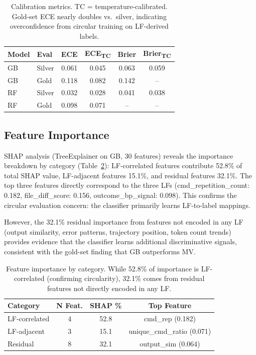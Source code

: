 \documentclass[11pt,a4paper]{article}
\begin{document}
\begin{table}[t]
\centering
\small
\begin{tabular}{llcccc}
\toprule
\textbf{Model} & \textbf{Eval} & \textbf{ECE} & \textbf{ECE\textsubscript{TC}} & \textbf{Brier} & \textbf{Brier\textsubscript{TC}} \\
\midrule
GB & Silver & 0.061 & 0.045 & 0.063 & 0.059 \\
GB & Gold & 0.118 & 0.082 & 0.142 & -- \\
RF & Silver & 0.032 & 0.028 & 0.041 & 0.038 \\
RF & Gold & 0.098 & 0.071 & -- & -- \\
\bottomrule
\end{tabular}
\caption{Calibration metrics. TC = temperature-calibrated. Gold-set ECE nearly doubles vs.\ silver, indicating overconfidence from circular training on LF-derived labels.}
\label{tab:calibration}
\end{table}

\subsection{Feature Importance}

SHAP analysis (TreeExplainer on GB, 30 features) reveals the importance breakdown by category (Table~\ref{tab:importance}):
LF-correlated features contribute 52.8\% of total SHAP value, LF-adjacent features 15.1\%, and residual features 32.1\%.
The top three features directly correspond to the three LFs (cmd\_repetition\_count: 0.182, file\_diff\_score: 0.156, outcome\_bp\_signal: 0.098).
This confirms the circular evaluation concern: the classifier primarily learns LF-to-label mappings.

However, the 32.1\% residual importance from features not encoded in any LF (output similarity, error patterns, trajectory position, token count trends) provides evidence that the classifier learns additional discriminative signals, consistent with the gold-set finding that GB outperforms MV.

\begin{table}[t]
\centering
\small
\begin{tabular}{lccc}
\toprule
\textbf{Category} & \textbf{N Feat.} & \textbf{SHAP \%} & \textbf{Top Feature} \\
\midrule
LF-correlated & 4 & 52.8 & cmd\_rep (0.182) \\
LF-adjacent & 3 & 15.1 & unique\_cmd\_ratio (0.071) \\
Residual & 8 & 32.1 & output\_sim (0.064) \\
\bottomrule
\end{tabular}
\caption{Feature importance by category. While 52.8\% of importance is LF-correlated (confirming circularity), 32.1\% comes from residual features not directly encoded in any LF.}
\label{tab:importance}
\end{table}
\end{document}
